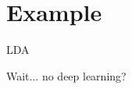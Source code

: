 \documentclass[14pt,dvipsnames]{beamer}
\begin{document}
\section{Example}

\begin{frame}{LDA}
\end{frame}

\begin{frame}{Wait... no deep learning?}
\end{frame}



\begin{frame}[allowframebreaks]


\end{frame}
\end{document}
